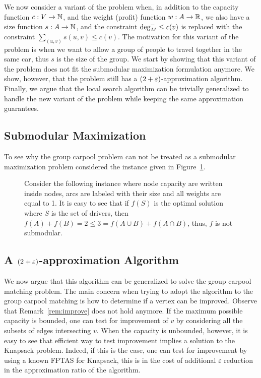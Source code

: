 
We now consider a variant of the problem when, in addition to the
capacity function $c:V \to \N$, and the weight (profit) function
$w:A \to \R$, we also have a size function $s:A \to \N$, and the
constraint $\din[M] \leq c(v)$ is replaced with the constraint
$\sum_{(u,v)}s(u,v) \leq c(v)$.  The motivation for this variant of
the problem is when we want to allow a group of people to travel
together in the same car, thus $s$ is the size of the group.  We start
by showing that this variant of the problem does not fit the
submodular maximization formulation anymore. We show, however, that
the problem still has a $(2 +\eps)$-approximation algorithm.  Finally,
we argue that the local search algorithm can be trivially generalized
to handle the new variant of the problem while keeping the same
approximation guarantees.


\subsection{Submodular Maximization}

To see why the group carpool problem can
not be treated as a submodular maximization problem considered the
instance given in Figure~\ref{fig:not submodular}.

\begin{figure}
\begin{center}

\end{center}
\caption{Consider the following instance where node capacity are
written inside nodes, arcs are labeled with their size and all weights
are equal to 1.  It is easy to see that if $f(S)$ is the optimal
solution where $S$ is the set of drivers, then $f(A) + f(B) = 2 \leq 3
= f(A \cup B) + f(A \cap B)$, thus, $f$ is not submodular.}
\label{fig:not submodular}
\end{figure}



\subsection{A $(2+\eps)$-approximation Algorithm}


We now argue that this algorithm can be generalized to solve the group carpool
matching problem.
The main concern when trying to adopt the algorithm to the group carpool
matching is how to determine if a vertex can be improved.
Observe that Remark~\ref{rem:improve} does not hold anymore.
If the maximum possible capacity is bounded, one can test for improvement of
$v$ by considering all the subsets of edges intersecting $v$. 
When the capacity is unbounded, however, it is easy to see that efficient
way to test improvement implies a solution to the Knapsack problem.
Indeed, if this is the case, one can test for improvement by using a known FPTAS
for Knapsack, this is in the cost of additional $\varepsilon$ reduction in the
approximation ratio of the algorithm.



